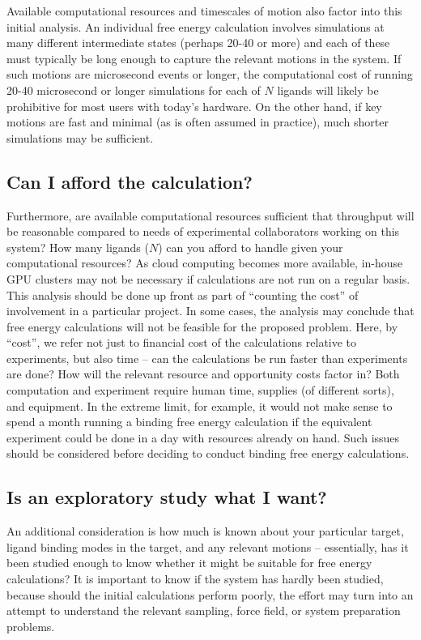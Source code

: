 \documentclass[9pt,bestpractices,pubversion]{livecoms}
\begin{document}
Available computational resources and timescales of motion also factor
into this initial analysis. An individual free energy calculation
involves simulations at many different intermediate states (perhaps
20-40 or more) and each of these must typically be long enough to
capture the relevant motions in the system. If such motions are
microsecond events or longer, the computational cost of running 20-40
microsecond or longer simulations for each of $N$ ligands will likely be
prohibitive for most users with today's hardware. On the other hand, if key motions are fast and minimal (as is often assumed in practice), much shorter simulations may be sufficient. 

\subsection{Can I afford the calculation?}
\label{subsec:affordability}
Furthermore, are available computational resources sufficient that throughput will be reasonable compared to needs of experimental collaborators working on
this system? How many ligands ($N$) can you afford to handle given
your computational resources? As cloud computing becomes more available, in-house GPU clusters may not be necessary if calculations are not run on a regular basis.
This analysis should be done up front as part of ``counting the cost''
of involvement in a particular project. In some cases, the analysis may conclude that free energy calculations will not be feasible for the proposed problem.
Here, by ``cost'', we refer not just to financial cost of the calculations relative to experiments, but also time -- can the calculations be run faster than experiments are done? How will the relevant resource and opportunity costs factor in? Both computation and experiment require human time, supplies (of different sorts), and equipment. In the extreme limit, for example, it would not make sense to spend a month running a binding free energy calculation if the equivalent experiment could be done in a day with resources already on hand. Such issues should be considered before deciding to conduct binding free energy calculations.

\subsection{Is an exploratory study what I want?}
\label{subsec:exploration}
An additional consideration is how much is known about your particular
target, ligand binding modes in the target, and any relevant motions
-- essentially, has it been studied enough to know whether it might be
suitable for free energy calculations? It is important to know if the system has hardly been studied, because should the initial calculations perform poorly, the effort may turn into an attempt to understand the relevant sampling, force field, or system preparation problems.
\end{document}
